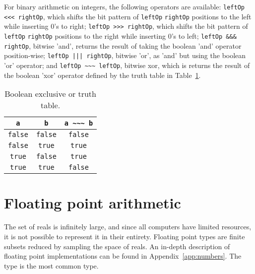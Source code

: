 For binary arithmetic on integers, the following operators are available:
\lstinline{leftOp <<< rightOp}, which shifts the bit pattern of \lstinline|leftOp| \lstinline|rightOp| positions to the left while inserting 0's to right;
\lstinline{leftOp >>> rightOp}, which shifts the bit pattern of \lstinline|leftOp| \lstinline|rightOp| positions to the right while inserting 0's to left;
\lstinline{leftOp &&& rightOp}, bitwise 'and', returns the result of taking the boolean 'and' operator position-wise;
\lstinline{leftOp ||| rightOp}, bitwise 'or', as 'and' but using the boolean 'or' operator; and
\lstinline{leftOp ~~~ leftOp}, bitwise xor, which is returns the result of the boolean 'xor' operator defined by the truth table in Table~\ref{tab:xor}.
\begin{table}
  \centering
  \begin{tabular}{|c|c|c|}
    \hline
    \rowcolor{headerRowColor} \lstinline!a! & \lstinline!b! & \lstinline!a ~~~ b!\\
    \hline
    \lstinline!false! & \lstinline!false! & \lstinline!false!\\
    \lstinline!false! & \lstinline!true! & \lstinline!true!\\
    \lstinline!true! & \lstinline!false! & \lstinline!true!\\
    \lstinline!true! & \lstinline!true! & \lstinline!false!\\
    \hline
  \end{tabular}
  \caption{Boolean exclusive or truth table.}
  \label{tab:xor}
\end{table}
%

\section{Floating point arithmetic}
The set of reals is infinitely large, and since all computers have limited resources, it is not possible to represent it in their entirety. Floating point types are finite subsets reduced by sampling the space of reals. An in-depth description of floating point implementations can be found in Appendix~\ref{app:numbers}. The type  is the most common type. 

